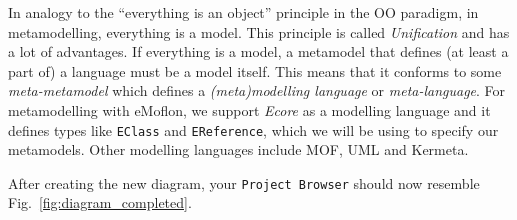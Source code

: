 In analogy to the ``everything is an object'' principle in the OO paradigm, in metamodelling, everything is a model.
This principle is called \emph{Unification} and has a lot of advantages.
If everything is a model, a metamodel that defines (at least a part of) a language must be a model itself.
This means that it conforms to some \emph{meta-metamodel} which defines a \emph{(meta)modelling language} or \emph{meta-language}.
For metamodelling with eMoflon, we support \emph{Ecore} as a modelling language and it defines types like \texttt{EClass} and \texttt{EReference}, which we will be using to specify  our metamodels.
Other modelling languages include MOF, UML and Kermeta. 

After creating the new diagram, your  \texttt{Project Browser} should now resemble Fig.~\ref{fig:diagram_completed}.  

